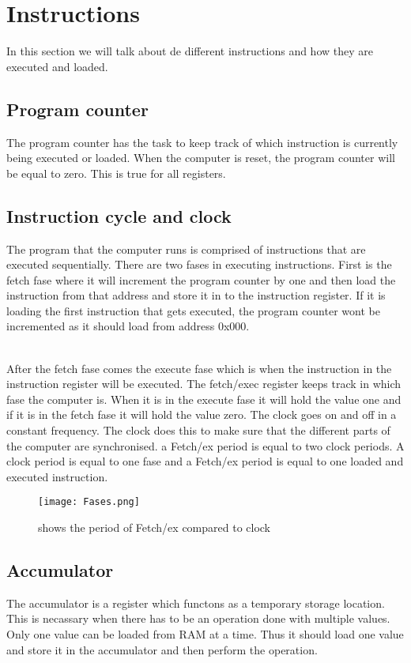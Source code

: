 \documentclass{article}
\begin{document}
\section{Instructions}
In this section we will talk about de different instructions and how they are executed and loaded.
\subsection{Program counter}
The program counter has the task to keep track of which instruction is currently being executed or loaded. When the computer is reset, the program counter will be equal to zero. This is true for all registers.
\subsection{Instruction cycle and clock\label{Instruction cycle}}
The program that the computer runs is comprised of instructions that are executed sequentially. There are two fases in executing instructions. First is the fetch fase where it will increment the program counter by one and then load the instruction from that address and store it in to the instruction register. If it is loading the first instruction that gets executed, the program counter wont be incremented as it should load from address 0x000. 

~\\
After the fetch fase comes the execute fase which is when the instruction in the instruction register will be executed. The fetch/exec register keeps track in which fase the computer is. When it is in the execute fase it will hold the value one and if it is in the fetch fase it will hold the value zero. The clock goes on and off in a constant frequency. The clock does this to make sure that the different parts of the computer are synchronised. a Fetch/ex period is equal to two clock periods. A clock period is equal to one fase and a Fetch/ex period is equal to one loaded and executed instruction.
\begin{figure}[h]
\texttt{[image: Fases.png]}
\caption{shows the period of Fetch/ex compared to clock}
\end{figure}
\subsection{Accumulator}
The accumulator is a register which functons as a temporary storage location. This is necassary when there has to be an operation done with multiple values. Only one value can be loaded from RAM at a time. Thus it should load one value and store it in the accumulator and then perform the operation.
\end{document}
